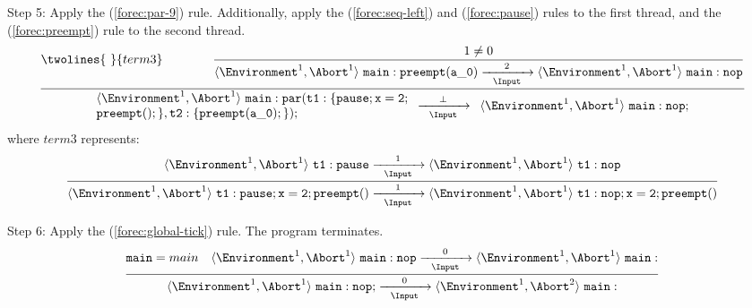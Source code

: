 \noindent
Step 5: Apply the (\ref{forec:par-9}) rule. Additionally, apply the 
(\ref{forec:seq-left}) and (\ref{forec:pause}) rules to the first thread,
and the (\ref{forec:preempt}) rule to the second thread.
\begin{equation*}
	\frac{
			\twolines{
				~
			}{
				term3
			}
			\qquad
			\qquad
		\dfrac{
				1 \neq 0
			}{
				\langle \Environment^1, \Abort^1 \rangle ~ \mathtt{main: preempt(a\_0)}
					\xrightarrow[~~\Input~~]{2} 
				\langle \Environment^1, \Abort^1 \rangle ~ \mathtt{main: nop}
			}
		}{
			\begin{array}{l}
				\langle \Environment^1, \Abort^1 \rangle ~ \mathtt{main: par( t1:\{pause;x=2;}		\\
				\mathtt{preempt();\}, t2:\{preempt(a\_0);\} );}										\\
			\end{array}
				\xrightarrow[~~\Input~~]{\bot} 
			\begin{array}{l}
				\langle \Environment^1, \Abort^1 \rangle ~ \mathtt{main: nop;}						\\
			\end{array}
		}
\end{equation*}
where $term3$ represents:
\begin{equation*}
	\frac{
			\langle \Environment^1, \Abort^1 \rangle ~ \mathtt{t1: pause}
				\xrightarrow[~~\Input~~]{1} 
			\langle \Environment^1, \Abort^1 \rangle ~ \mathtt{t1: nop}
		}{
			\langle \Environment^1, \Abort^1 \rangle ~ \mathtt{t1: pause;x=2; preempt()}
				\xrightarrow[~~\Input~~]{1} 
			\langle \Environment^1, \Abort^1 \rangle ~ \mathtt{t1: nop;x=2; preempt()}
		}
\end{equation*}

\noindent
Step 6: Apply the (\ref{forec:global-tick}) rule.
The program terminates.
\begin{equation*}
	\frac{
			\mathtt{main} = main
			\quad
			\langle \Environment^1, \Abort^1 \rangle ~ \mathtt{main: nop}
				\xrightarrow[~~\Input~~]{0} 
			\langle \Environment^1, \Abort^1 \rangle ~ \mathtt{main: }
		}{
			\langle \Environment^1, \Abort^1 \rangle ~ \mathtt{main: nop;}
				\xrightarrow[~~\Input~~]{0} 
			\langle \Environment^1, \Abort^2 \rangle ~ \mathtt{main: }
		}
\end{equation*}
